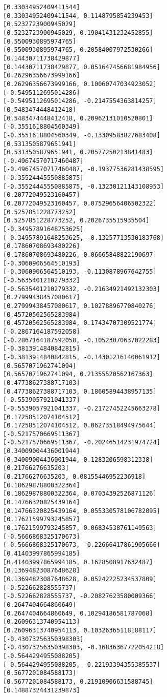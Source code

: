 \documentclass[11pt]{article}
\begin{document}
\begin{Verbatim}[commandchars=\\\{\}]
[0.33034952409411544]
[0.33034952409411544, 0.1148795854239453]
[0.5232723900945029]
[0.5232723900945029, 0.19041431232452855]
[0.5500930895974765]
[0.5500930895974765, 0.20584007972530266]
[0.14430711738429877]
[0.14430711738429877, 0.051647456681984956]
[0.26296356673999166]
[0.26296356673999166, 0.10060747034923052]
[-0.5495112695014286]
[-0.5495112695014286, -0.2147554363814257]
[0.5483474448412418]
[0.5483474448412418, 0.20962131010520801]
[-0.3551618804560349]
[-0.3551618804560349, -0.13309583827683408]
[0.5313505879651941]
[0.5313505879651941, 0.20577250213841483]
[-0.49674570717460487]
[-0.49674570717460487, -0.19377536281438595]
[-0.35524445550885875]
[-0.35524445550885875, -0.13230121143108953]
[0.20772049523160457]
[0.20772049523160457, 0.07529656406502322]
[0.5257851228773252]
[0.5257851228773252, 0.2026735515935504]
[-0.34957891648253625]
[-0.34957891648253625, -0.13257713530183768]
[0.17860708693480226]
[0.17860708693480226, 0.06665848822190697]
[-0.3060906564510193]
[-0.3060906564510193, -0.1130878967642755]
[-0.5635401210279332]
[-0.5635401210279332, -0.21634921492132303]
[0.27999438457080617]
[0.27999438457080617, 0.10278896770840276]
[0.45720562565283984]
[0.45720562565283984, 0.17434707309521774]
[-0.2867164187592058]
[-0.2867164187592058, -0.10523070637022283]
[-0.3813914840842815]
[-0.3813914840842815, -0.14301216140061912]
[0.5657071962741094]
[0.5657071962741094, 0.21355520562167363]
[0.47738627388717103]
[0.47738627388717103, 0.18605894438957135]
[-0.5539057921041337]
[-0.5539057921041337, -0.21727452245663278]
[0.17258512074104512]
[0.17258512074104512, 0.06273518494975644]
[-0.5217570669511367]
[-0.5217570669511367, -0.20246514231974724]
[0.34009004436001944]
[0.34009004436001944, 0.1283206598312338]
[0.21766276635203]
[0.21766276635203, 0.08155446952236918]
[0.18629878800322364]
[0.18629878800322364, 0.07034392526871126]
[0.14766320825439164]
[0.14766320825439164, 0.055330578106782095]
[0.17621599793245857]
[0.17621599793245857, 0.06834538761149563]
[-0.5666868325170673]
[-0.5666868325170673, -0.22666417861905666]
[0.41403997865994185]
[0.41403997865994185, 0.1628508917632487]
[0.13694823087648628]
[0.13694823087648628, 0.05242225234537809]
[-0.522662828555737]
[-0.522662828555737, -0.20827623580009366]
[0.2647404664860649]
[0.2647404664860649, 0.10294186581787068]
[0.26096313740954113]
[0.26096313740954113, 0.10326365118188117]
[-0.43073256350398303]
[-0.43073256350398303, -0.16836367722054218]
[-0.5644294955088205]
[-0.5644294955088205, -0.22193394355385537]
[0.5677201084588173]
[0.5677201084588173, 0.21910906631588745]
[0.14887324431239873]

\end{Verbatim}
\end{document}
